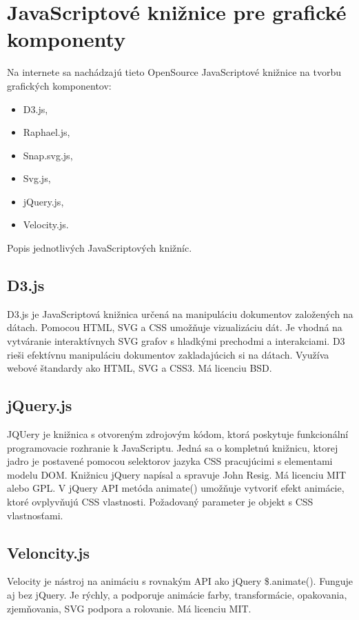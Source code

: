 \section{JavaScriptové knižnice pre grafické komponenty}
Na internete sa nachádzajú tieto OpenSource JavaScriptové knižnice na tvorbu grafických komponentov: 
\begin{itemize}
	\item \acs{D3}.js, 
	\item Raphael.js, \item Snap.svg.js,  
	\item Svg.js, 
    \item jQuery.js, \item Velocity.js.
\end{itemize}

Popis jednotlivých JavaScriptových knižníc.
\subsection{D3.js}
D3.js je JavaScriptová knižnica určená na manipuláciu dokumentov založených na dátach. Pomocou \acs{HTML}, \acs{SVG} a \acs{CSS} umožňuje vizualizáciu dát. Je vhodná na vytváranie interaktívnych SVG grafov s hladkými prechodmi a interakciami.  D3 rieši efektívnu manipuláciu dokumentov zakladajúcich si na dátach. Využíva webové štandardy ako \acs{HTML}, \acs{SVG} a \acs{CSS}3. \cite{d3js} Má licenciu BSD.

\subsection{jQuery.js}
JQUery je knižnica s otvoreným zdrojovým kódom, ktorá poskytuje funkcionální programovacie rozhranie k JavaScriptu. Jedná sa o kompletnú knižnicu, ktorej jadro je postavené pomocou selektorov jazyka \acs{CSS} pracujúcimi s elementami modelu \acs{DOM}. Knižnicu jQuery napísal a spravuje John Resig. Má licenciu MIT alebo GPL.  \cite{Zakas}  
V jQuery API metóda animate() umožňuje vytvoriť efekt animácie, ktoré ovplyvňujú CSS vlastnosti. Požadovaný parameter je objekt s CSS vlastnosťami. \cite{jquery}

\subsection{Veloncity.js}
Velocity je nástroj na animáciu s rovnakým \acs{API} ako jQuery  \$.animate(). Funguje aj bez jQuery. Je rýchly, a podporuje animácie farby, transformácie, opakovania, zjemňovania, SVG podpora a rolovanie. \cite{velocity}
Má licenciu MIT. 

